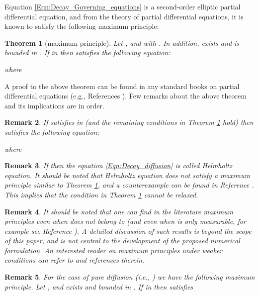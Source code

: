 \documentclass[11pt]{amsart}
\newtheorem{theorem}{Theorem}[section]
\newtheorem{remark}[theorem]{Remark}
\begin{document}
Equation \eqref{Eqn:Decay_Governing_equations} is a second-order elliptic partial differential 
equation, and from the theory of partial differential equations, it is known to satisfy the 
following maximum principle: 
\begin{theorem}[maximum principle]
  \label{Theorem:Decay_maximum_principle}
  Let  , and  with . In addition,  exists and is bounded in . If  in  
  then  satisfies the following equation: 

where 
  
\end{theorem}
\noindent A proof to the above theorem can be found in any standard books on partial differential 
equations (e.g., References \cite{Fraenkel_maximum_principles,Gilbarg_Trudinger,Protter_Weinberger}). 
Few remarks about the above theorem and its implications are in order.
\begin{remark}
\label{Remark:Decay_max_min}
  If  satisfies  in  (and the remaining conditions 
  in Theorem \ref{Theorem:Decay_maximum_principle} hold) then  satisfies the 
  following equation: 

where 
  
\end{remark}
\begin{remark}
  If  then the equation \eqref{Eqn:Decay_diffusion} is called 
  Helmholtz equation. It should be noted that Helmholtz equation does not satisfy a 
  maximum principle similar to Theorem \ref{Theorem:Decay_maximum_principle}, and a 
  counterexample can be found in Reference \cite{Protter_Weinberger}. This implies 
  that the condition  in Theorem \ref{Theorem:Decay_maximum_principle} 
  cannot be relaxed. 
\end{remark}
\begin{remark}
  It should be noted that one can find in the literature maximum principles even when 
   does not belong to  (and even when  
  is only measurable, for example see Reference \cite{Trudinger_MathZ_1977_v156_p291}). 
  A detailed discussion of such results is beyond the scope of this paper, and is not central 
  to the development of the proposed numerical formulation. An interested reader on maximum 
  principles under weaker conditions can refer to \cite{Pucci_Serrin,Protter_Weinberger,
  Gilbarg_Trudinger,Fraenkel_maximum_principles} and references therein.
\end{remark}
\begin{remark}
  \label{Remark:Decay_pure_diffusion}
  For the case of pure diffusion (i.e., ) we have the following 
  maximum principle. Let  , and 
   exists and bounded in . If  in  then  
  satisfies 

\end{remark}
\end{document}
